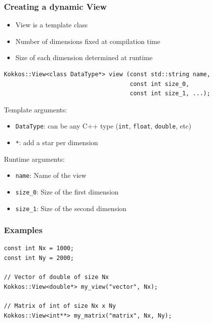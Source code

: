 \documentclass[aspectratio=169]{beamer}
\begin{document}

\begin{frame}[fragile]
    \frametitle{Creating a dynamic View}

\begin{itemize}
    \item View is a template class
    \item Number of dimensions fixed at compilation time
    \item Size of each dimension determined at runtime
\end{itemize}

\footnotesize
\begin{verbatim}
Kokkos::View<class DataType*> view (const std::string name, 
                                    const int size_0, 
                                    const int size_1, ...);
\end{verbatim}

Template arguments:

\begin{itemize}
    \item \texttt{DataType}: can be any C++ type (\texttt{int}, \texttt{float}, \texttt{double}, etc)
    \item \texttt{*}: add a star per dimension
\end{itemize}

Runtime arguments:

\begin{itemize}
    \item \texttt{name}: Name of the view
    \item \texttt{size\_0}: Size of the first dimension
    \item \texttt{size\_1}: Size of the second dimension
\end{itemize}


\end{frame}


\begin{frame}[fragile]
    \frametitle{Examples}

\small
\begin{verbatim}
const int Nx = 1000;
const int Ny = 2000;

// Vector of double of size Nx
Kokkos::View<double*> my_view("vector", Nx);

// Matrix of int of size Nx x Ny
Kokkos::View<int**> my_matrix("matrix", Nx, Ny);
\end{verbatim}

\end{frame} 
\end{document}
